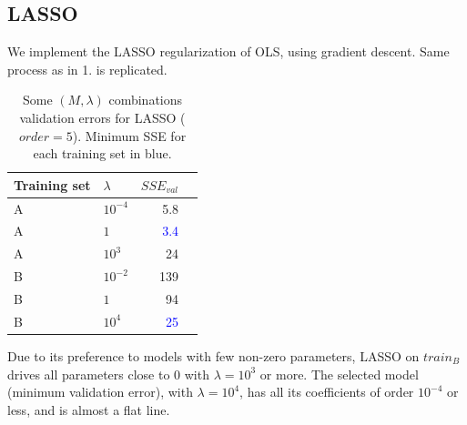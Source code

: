 \documentclass[twoside]{article}
\begin{document}
\subsection{LASSO}

We implement the LASSO regularization of OLS, using gradient descent. Same process as in 1. is replicated.

\begin{table}[H]
\caption{Some $(M, \lambda)$ combinations validation errors for LASSO ($order = 5$). Minimum SSE for each training set in blue.}
\centering
\begin{tabular}{llrr}
\toprule
Training set & $\lambda$ & $SSE_{val}$ \\
\midrule

A & $10^{-4}$ &  5.8\\
A & $1$ & \textcolor{blue}{3.4}\\
A & $10^3$ & 24\\
B & $10^{-2}$ & 139\\
B & $1$ & 94\\
B & $10^4$ & \textcolor{blue}{25}\\
\bottomrule
\end{tabular}
\end{table}


Due to its preference to models with few non-zero parameters, LASSO on $train_B$ drives all parameters close to 0 with $\lambda=10^{3}$ or more. The selected model (minimum validation error), with $\lambda=10^{4}$, has all its coefficients of order $10^{-4}$ or less, and is almost a flat line.
\vspace{.1 in}
\end{document}

